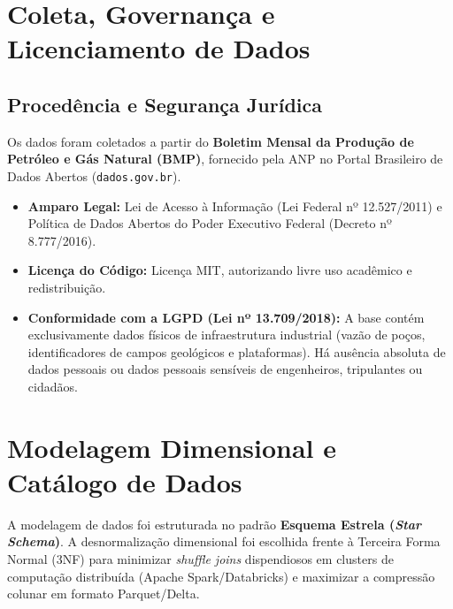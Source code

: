 \documentclass[12pt,a4paper]{article}
\begin{document}
\section{Coleta, Governança e Licenciamento de Dados}

\subsection{Procedência e Segurança Jurídica}
Os dados foram coletados a partir do \textbf{Boletim Mensal da Produção de Petróleo e Gás Natural (BMP)}, fornecido pela ANP no Portal Brasileiro de Dados Abertos (\texttt{dados.gov.br}). 
\begin{itemize}[leftmargin=*]
    \item \textbf{Amparo Legal:} Lei de Acesso à Informação (Lei Federal nº 12.527/2011) e Política de Dados Abertos do Poder Executivo Federal (Decreto nº 8.777/2016).
    \item \textbf{Licença do Código:} Licença MIT, autorizando livre uso acadêmico e redistribuição.
    \item \textbf{Conformidade com a LGPD (Lei nº 13.709/2018):} A base contém exclusivamente dados físicos de infraestrutura industrial (vazão de poços, identificadores de campos geológicos e plataformas). Há ausência absoluta de dados pessoais ou dados pessoais sensíveis de engenheiros, tripulantes ou cidadãos.
\end{itemize}

\section{Modelagem Dimensional e Catálogo de Dados}

A modelagem de dados foi estruturada no padrão \textbf{Esquema Estrela (\textit{Star Schema})}. A desnormalização dimensional foi escolhida frente à Terceira Forma Normal (3NF) para minimizar \textit{shuffle joins} dispendiosos em clusters de computação distribuída (Apache Spark/Databricks) e maximizar a compressão colunar em formato Parquet/Delta.
\end{document}
